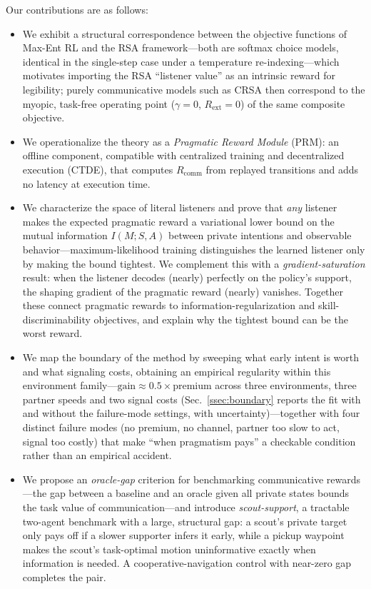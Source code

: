 \documentclass{article}
\newcommand{\Rcomm}{R_{\text{comm}}}
\newcommand{\Rext}{R_{\text{ext}}}
\begin{document}
Our contributions are as follows:
\begin{itemize}
\item We exhibit a structural correspondence between the objective functions of Max-Ent RL and the RSA framework---both are softmax choice models, identical in the single-step case under a temperature re-indexing---which motivates importing the RSA ``listener value'' as an intrinsic reward for legibility; purely communicative models such as CRSA \cite{estienne2025collaborative} then correspond to the myopic, task-free operating point ($\gamma=0$, $\Rext=0$) of the same composite objective.
\item We operationalize the theory as a \emph{Pragmatic Reward Module} (PRM): an offline component, compatible with centralized training and decentralized execution (CTDE), that computes $\Rcomm$ from replayed transitions and adds no latency at execution time.
\item We characterize the space of literal listeners and prove that \emph{any} listener makes the expected pragmatic reward a variational lower bound on the mutual information $I(M; S, A)$ between private intentions and observable behavior---maximum-likelihood training distinguishes the learned listener only by making the bound tightest. We complement this with a \emph{gradient-saturation} result: when the listener decodes (nearly) perfectly on the policy's support, the shaping gradient of the pragmatic reward (nearly) vanishes. Together these connect pragmatic rewards to information-regularization \cite{strouse2018learning} and skill-discriminability \cite{eysenbach2019diversity} objectives, and explain why the tightest bound can be the worst reward.
\item We map the boundary of the method by sweeping what early intent is worth and what signaling costs, obtaining an empirical regularity within this environment family---$\text{gain}\approx0.5\times\text{premium}$ across three environments, three partner speeds and two signal costs (Sec.~\ref{ssec:boundary} reports the fit with and without the failure-mode settings, with uncertainty)---together with four distinct failure modes (no premium, no channel, partner too slow to act, signal too costly) that make ``when pragmatism pays'' a checkable condition rather than an empirical accident.
\item We propose an \emph{oracle-gap} criterion for benchmarking communicative rewards---the gap between a baseline and an oracle given all private states bounds the task value of communication---and introduce \emph{scout-support}, a tractable two-agent benchmark with a large, structural gap: a scout's private target only pays off if a slower supporter infers it early, while a pickup waypoint makes the scout's task-optimal motion uninformative exactly when information is needed. A cooperative-navigation control with near-zero gap completes the pair.

\end{itemize}
\end{document}
